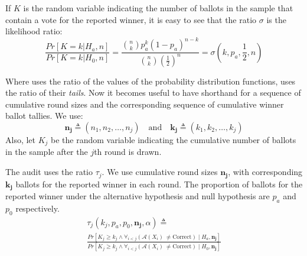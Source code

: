 If $K$ is the random variable indicating the number of ballots in the sample that contain a vote for the reported winner, it is easy to see that the ratio $\sigma$ is the likelihood ratio:
$$
\frac{Pr[K=k|H_a,n]}{Pr[K=k|H_0,n]}= \frac{\binom{n}{k}p_a^{k} (1-p_a)^{n-k}}{\binom{n}{k}(\frac{1}{2})^n} =\sigma(k, p_a, \frac{1}{2}, n)
$$

\begin{comment}
\begin{definition}[$(\alpha,p)$-\BRAVO ]\label{def:bravo}  An audit $\mathcal{A}$ is the \B~$(\alpha, p)$-\BRAVO audit iff the following stopping condition is tested at each ballot draw. If the sample $X$ is of size $n$ and has $k$ ballots for the winner,  
\begin{equation}
    \mathcal{A}(X) =  \left\{ \begin{array}{ll} \text{Correct} & ~\sigma(k, p, \frac{1}{2}, n) 
        \geq \frac{1}{\alpha}\\
        Undetermined & ~else 
    \end{array}
    \right .
    \label{eqn:bravo}
\end{equation}
\end{definition}
\end{comment}

Where \BRAVO uses the ratio of the values of the probability distribution functions, \Minerva uses the ratio of their \emph{tails}. Now it becomes useful to have shorthand for a sequence of cumulative round sizes and the corresponding sequence
of cumulative winner ballot tallies.
We use:
$$\bm{n_j}\triangleq(n_1,n_2,\ldots,n_j) \quad\text{and}\quad \bm{k_j}\triangleq(k_1,k_2,\ldots,k_j)$$
Also, let $K_j$ be the random variable indicating the cumulative number of ballots in the sample after the $j$th round is drawn.

\begin{definition} \label{def:minerva_ratio} The \R \Minerva audit uses the ratio $\tau_j$. We use cumulative round sizes $\bm{n_j}$, with corresponding $\bm{k_j}$ ballots for the reported winner in each round. The proportion of ballots for the reported winner under the alternative hypothesis and null hypothesis are $p_a$ and $p_0$ respectively.
         \begin{equation}
         \begin{aligned}
             \label{eqn:tau}
                 \tau_{j}(k_{j}, p_a,p_0, \bm{n_j}, \alpha )  \triangleq\\
                 \frac{Pr[K_{j} \geq k_{j} \wedge \forall_{i < j} ({\mathcal{A}}(X_i) ~\neq \text{Correct}) \mid H_a, \bm{n_j}]}{Pr[K_{j} \geq k_{j} \wedge \forall_{i < j} ({\mathcal{A}}(X_i) ~\neq \text{Correct}) \mid H_0, \bm{n_j}]}
         \end{aligned}
         \end{equation}
\end{definition}

